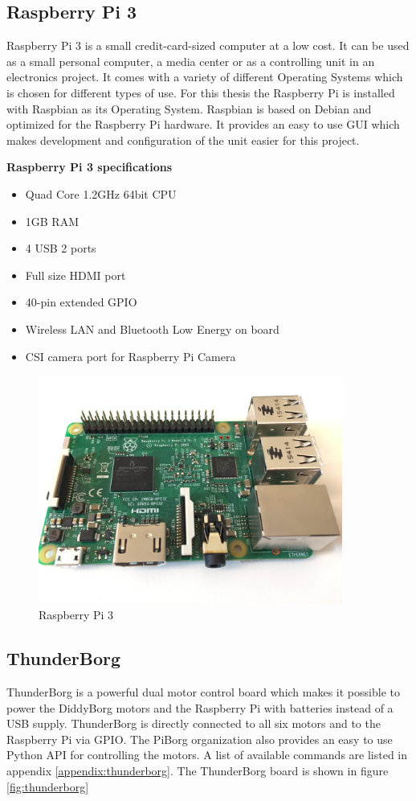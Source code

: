 \subsection{Raspberry Pi 3}
Raspberry Pi 3 is a small credit-card-sized computer at a low cost. It can be used as a small personal computer, a media center or as a controlling unit in an electronics project. It comes with a variety of different Operating Systems which is chosen for different types of use. For this thesis the Raspberry Pi is installed with Raspbian as its Operating System. Raspbian is based on Debian and optimized for the Raspberry Pi hardware. It provides an easy to use GUI which makes development and configuration of the unit easier for this project. 

\textbf{Raspberry Pi 3 specifications}
\begin{itemize}
\item Quad Core 1.2GHz 64bit CPU
\item 1GB RAM
\item 4 USB 2 ports
\item Full size HDMI port
\item 40-pin extended GPIO
\item Wireless LAN and Bluetooth Low Energy on board
\item CSI camera port for Raspberry Pi Camera
\end{itemize}

\begin{figure}[H]
\centering
\includegraphics[width=10cm]{images/Raspi3.jpg}
\caption{Raspberry Pi 3}
\label{fig:raspberry-pi}
\end{figure}

\subsection{ThunderBorg}
ThunderBorg is a powerful dual motor control board which makes it possible to power the DiddyBorg motors and the Raspberry Pi with batteries instead of a USB supply. ThunderBorg is directly connected to all six motors and  to the Raspberry Pi via GPIO. The PiBorg organization also provides an easy to use Python API for controlling the motors. A list of available commands are listed in appendix \ref{appendix:thunderborg}. The ThunderBorg board is shown in figure \ref{fig:thunderborg}

